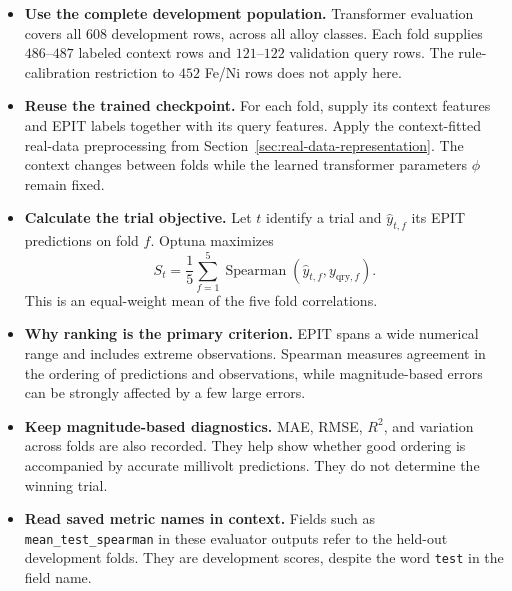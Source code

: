 \documentclass[11pt]{article}
\newenvironment{notes}
  {\begin{itemize}\setlength{\itemsep}{0.45em}\setlength{\parsep}{0pt}}
  {\end{itemize}}
\begin{document}
\begin{notes}
    \item \textbf{Use the complete development population.}
    Transformer evaluation covers all \(608\) development
    rows, across all alloy classes.
    Each fold supplies \(486\)--\(487\) labeled context rows
    and \(121\)--\(122\) validation query rows.
    The rule-calibration restriction to \(452\) Fe/Ni rows
    does not apply here.

    \item \textbf{Reuse the trained checkpoint.}
    For each fold, supply its context features and EPIT
    labels together with its query features.
    Apply the context-fitted real-data preprocessing from
    Section~\ref{sec:real-data-representation}.
    The context changes between folds while the learned
    transformer parameters \(\phi\) remain fixed.

    \item \textbf{Calculate the trial objective.}
    Let \(t\) identify a trial and
    \(\widehat y_{t,f}\) its EPIT predictions on fold \(f\).
    Optuna maximizes
    \begin{equation}
        S_t
        =
        \frac{1}{5}\sum_{f=1}^{5}
        \operatorname{Spearman}
        \!\left(\widehat y_{t,f},y_{\mathrm{qry},f}\right).
        \label{eq:optuna-objective}
    \end{equation}
    This is an equal-weight mean of the five fold correlations.

    \item \textbf{Why ranking is the primary criterion.}
    EPIT spans a wide numerical range and includes extreme
    observations. Spearman measures agreement in the ordering
    of predictions and observations, while magnitude-based
    errors can be strongly affected by a few large errors.

    \item \textbf{Keep magnitude-based diagnostics.}
    MAE, RMSE, \(R^2\), and variation across folds are also
    recorded. They help show whether good ordering is
    accompanied by accurate millivolt predictions.
    They do not determine the winning trial.

    \item \textbf{Read saved metric names in context.}
    Fields such as \texttt{mean\_test\_spearman} in these
    evaluator outputs refer to the held-out development
    folds. They are development scores, despite the word
    \texttt{test} in the field name.
\end{notes}
\end{document}
